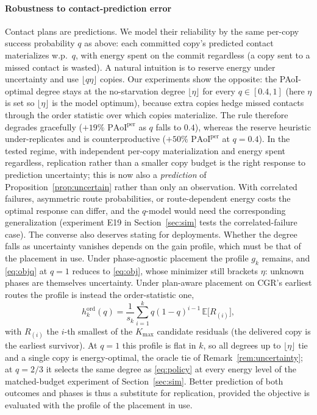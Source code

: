 \documentclass[twocolumn,3p,times,procedia]{elsarticle}
\theoremstyle{plain}
\theoremstyle{remark}
\newcommand{\PAoIper}{\mathrm{PAoI}^{\mathrm{per}}}
\newcommand{\E}{\mathbb{E}}
\begin{document}
\paragraph*{Robustness to contact-prediction error}
Contact plans are predictions. We model their reliability by the same
per-copy success probability $q$ as above: each committed copy's
predicted contact materializes w.p.\ $q$, with energy spent on the
commit regardless (a copy sent to a missed contact is wasted). A natural
intuition is to reserve energy under uncertainty and use $\lfloor
q\eta\rfloor$ copies. Our experiments show the opposite: the
PAoI-optimal degree stays at the no-starvation degree
$\lfloor\eta\rfloor$ for every $q\in[0.4,1]$ (here $\eta$ is set so
$\lfloor\eta\rfloor$ is the model optimum), because extra copies hedge
missed contacts through the order statistic over which copies
materialize. The rule therefore degrades gracefully ($+19\%$ $\PAoIper$ as $q$
falls to $0.4$), whereas the reserve heuristic under-replicates and is
counterproductive ($+50\%$ $\PAoIper$ at $q{=}0.4$). In the tested
regime, with independent per-copy materialization and energy spent
regardless, replication rather than a smaller copy budget is the right
response to prediction uncertainty; this is now also a
\emph{prediction} of Proposition~\ref{prop:uncertain} rather than only
an observation. With correlated failures, asymmetric route
probabilities, or route-dependent energy costs the optimal response can
differ, and the $q$-model would need the corresponding generalization
(experiment E19 in Section~\ref{sec:sim} tests the correlated-failure
case). The converse also deserves stating for deployments. Whether the
degree falls as uncertainty vanishes depends on the gain profile, which
must be that of the placement in use. Under phase-agnostic placement
the profile $g_k$ remains, and \eqref{eq:objq} at $q{=}1$ reduces to
\eqref{eq:obj}, whose minimizer still brackets $\eta$: unknown phases
are themselves uncertainty. Under plan-aware placement on CGR's
earliest routes the profile is instead the order-statistic one,
\begin{equation}\label{eq:hord}
h^{\mathrm{ord}}_k(q)=\frac{1}{s_k}\sum_{i=1}^{k}q(1-q)^{i-1}\,
\E\bigl[R_{(i)}\bigr],
\end{equation}
with $R_{(i)}$ the $i$-th smallest of the $K_{\max}$ candidate
residuals (the delivered copy is the earliest survivor). At $q{=}1$
this profile is flat in $k$, so all degrees up to $\lfloor\eta\rfloor$
tie and a single copy is energy-optimal, the oracle tie of
Remark~\ref{rem:uncertainty}; at $q{=}2/3$ it selects the
same degree as \eqref{eq:policy} at every energy level of the
matched-budget experiment of Section~\ref{sec:sim}. Better prediction
of both outcomes and phases is thus a substitute for replication,
provided the objective is evaluated with the profile of the placement
in use.
\end{document}
